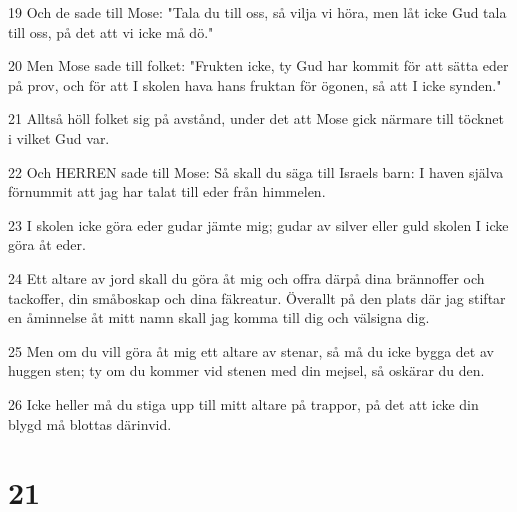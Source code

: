 \par 19 Och de sade till Mose: "Tala du till oss, så vilja vi höra, men låt icke Gud tala till oss, på det att vi icke må dö."
\par 20 Men Mose sade till folket: "Frukten icke, ty Gud har kommit för att sätta eder på prov, och för att I skolen hava hans fruktan för ögonen, så att I icke synden."
\par 21 Alltså höll folket sig på avstånd, under det att Mose gick närmare till töcknet i vilket Gud var.
\par 22 Och HERREN sade till Mose: Så skall du säga till Israels barn: I haven själva förnummit att jag har talat till eder från himmelen.
\par 23 I skolen icke göra eder gudar jämte mig; gudar av silver eller guld skolen I icke göra åt eder.
\par 24 Ett altare av jord skall du göra åt mig och offra därpå dina brännoffer och tackoffer, din småboskap och dina fäkreatur. Överallt på den plats där jag stiftar en åminnelse åt mitt namn skall jag komma till dig och välsigna dig.
\par 25 Men om du vill göra åt mig ett altare av stenar, så må du icke bygga det av huggen sten; ty om du kommer vid stenen med din mejsel, så oskärar du den.
\par 26 Icke heller må du stiga upp till mitt altare på trappor, på det att icke din blygd må blottas därinvid.

\chapter{21}

